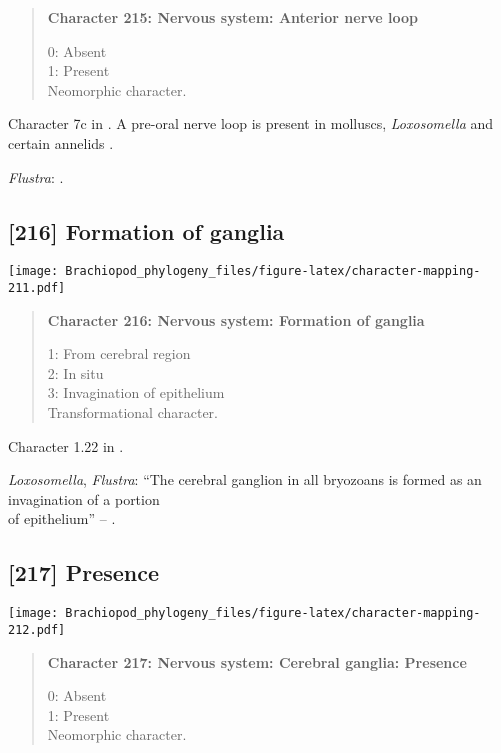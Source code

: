 \documentclass[openany]{book}
\theoremstyle{definition}
\theoremstyle{definition}
\theoremstyle{definition}
\theoremstyle{remark}
\begin{document}
\begin{quote}
\textbf{Character 215: Nervous system: Anterior nerve loop}

0: Absent\\
1: Present\\
Neomorphic character.
\end{quote}

Character 7c in \citet{Haszprunar2008}. A pre-oral nerve loop is present
in molluscs, \emph{Loxosomella} and certain annelids
\citep{Wanninger2007}.

\hypertarget{Flustra-coding-215}{}
\emph{Flustra}: \citet{Temereva2016Thenervous}.

\subsection*{{[}216{]} Formation of ganglia}\label{formation-of-ganglia}

\texttt{[image: Brachiopod\_phylogeny\_files/figure-latex/character-mapping-211.pdf]}

\begin{quote}
\textbf{Character 216: Nervous system: Formation of ganglia}

1: From cerebral region\\
2: In situ\\
3: Invagination of epithelium\\
Transformational character.
\end{quote}

Character 1.22 in \citet{SPS1996}.

\hypertarget{Flustra-coding-216}{}
\emph{Loxosomella}, \emph{Flustra}: ``The cerebral ganglion in all
bryozoans is formed as an invagination of a portion\\
of epithelium'' -- \citet{Temereva2016Thenervous}.

\subsection*{{[}217{]} Presence}\label{presence-5}

\texttt{[image: Brachiopod\_phylogeny\_files/figure-latex/character-mapping-212.pdf]}

\begin{quote}
\textbf{Character 217: Nervous system: Cerebral ganglia: Presence}

0: Absent\\
1: Present\\
Neomorphic character.
\end{quote}
\end{document}
